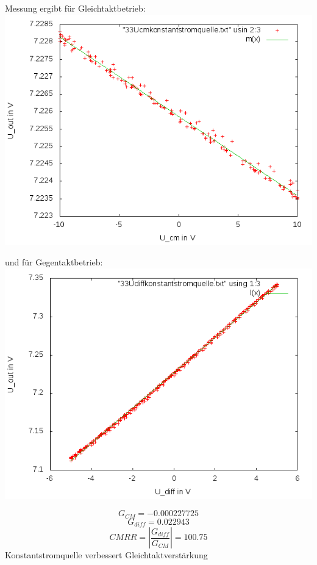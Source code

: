 \documentclass[compress,11pt]{beamer}
\begin{document}
\begin{frame}
Messung ergibt für Gleichtaktbetrieb:
\includegraphics[width=.7\textwidth]{../daten/messungen/3aufgabe/2cm}\\
\end{frame}
\begin{frame}
und für Gegentaktbetrieb:
\includegraphics[width=.7\textwidth]{../daten/messungen/3aufgabe/2diff}\\
\end{frame}
\begin{frame}
\begin{equation}
G_{CM} = -0.000227725
\end{equation}
\begin{equation}
G_{diff} = 0.022943
\end{equation}
\begin{equation}
CMRR = |\frac{G_{diff}}{G_{CM}}| = 100.75
\end{equation}
Konstantstromquelle verbessert Gleichtaktverstärkung

\end{frame}
\end{document}
